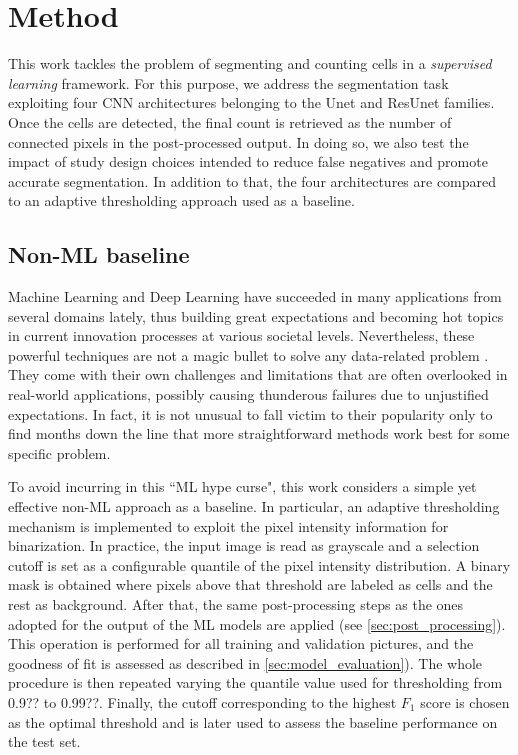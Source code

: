 \chapter{Method}
\label{chap:partI_methods}

This work tackles the problem of segmenting and counting cells in a \textit{supervised learning} framework. For this purpose, we address the segmentation task exploiting four CNN architectures belonging to the Unet and ResUnet families. 
Once the cells are detected, the final count is retrieved as the number of connected pixels in the post-processed output.
In doing so, we also test the impact of study design choices intended to reduce false negatives and promote accurate segmentation.
In addition to that, the four architectures are compared to an adaptive thresholding approach used as a baseline. 

\section{Non-ML baseline}
\label{baseline}

Machine Learning and Deep Learning have succeeded in many applications from several domains lately, thus building great expectations and becoming hot topics in current innovation processes at various societal levels.
Nevertheless, these powerful techniques are not a magic bullet to solve any data-related problem \cite{wolpert1997nofreelunch}. They come with their own challenges and limitations that are often overlooked in real-world applications, possibly causing thunderous failures due to unjustified expectations.
In fact, it is not unusual to fall victim to their popularity only to find months down the line that more straightforward methods work best for some specific problem.

To avoid incurring in this ``ML hype curse", this work considers a simple yet effective non-ML approach as a baseline. 
In particular, an adaptive thresholding mechanism is implemented to exploit the pixel intensity information for binarization.
In practice, the input image is read as grayscale and a selection cutoff is set as a configurable quantile of the pixel intensity distribution.
A binary mask is obtained where pixels above that threshold are labeled as cells and the rest as background.
After that, the same post-processing steps as the ones adopted for the output of the ML models are applied (see \cref{sec:post_processing}).
This operation is performed for all training and validation pictures, and the goodness of fit is assessed as described in \cref{sec:model_evaluation}).
The whole procedure is then repeated varying the quantile value used for thresholding from 0.9?? to 0.99??.
Finally, the cutoff corresponding to the highest $F_1$ score is chosen as the optimal threshold and is later used to assess the baseline performance on the test set.

